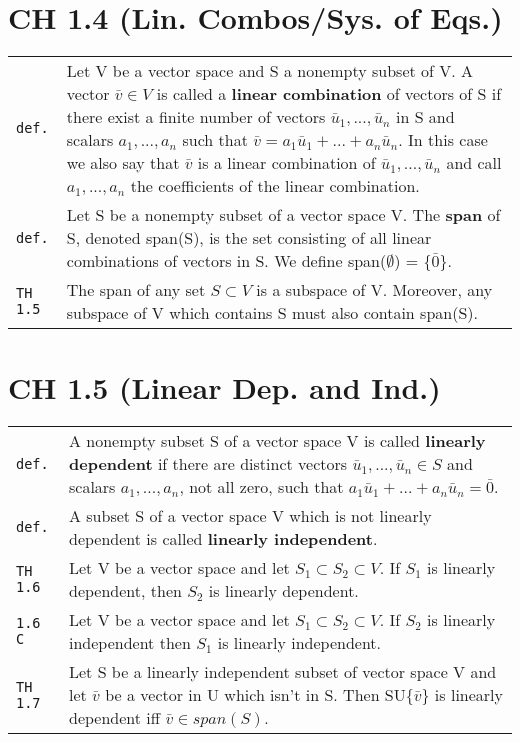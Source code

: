\documentclass[10pt,landscape]{article}
\begin{document}
\begin{multicols}{3}
\section{CH 1.4 (Lin. Combos/Sys. of Eqs.)}
\begin{tabular}{@{}p{\the\MyLen}%
                @{}p{\linewidth-\the\MyLen}@{}} %
\verb!def.! & Let V be a vector space and S a nonempty subset of V. A vector $\bar v \in V$ is called a \textbf{linear combination} of vectors of S if there exist a finite number of vectors $\bar u_1 , ..., \bar u_n$ in S and scalars $a_1 ,..., a_n$ such that $\bar v = a_1 \bar u_1 + ... + a_n \bar u_n$.
		   In this case we also say that $\bar v$ is a linear combination of $\bar u_1 ,..., \bar u_n$ and call $a_1 ,..., a_n$ the coefficients of the linear combination.\\
\verb!def.! & Let S be a nonempty subset of a vector space V. The \textbf{span} of S, denoted span(S), is the set consisting of all linear combinations of vectors in S. We define span($\emptyset$) = \{$\bar 0$\}.\\
\verb!TH 1.5! & The span of any set $S\subset V$ is a subspace of V. Moreover, any subspace of V which contains S must also contain span(S).
\end{tabular}

\section{CH 1.5 (Linear Dep. and Ind.)}
\begin{tabular}{@{}p{\the\MyLen}%
                @{}p{\linewidth-\the\MyLen}@{}} %
\verb!def.! & A nonempty subset S of a vector space V is called \textbf{linearly dependent} if there are distinct vectors $\bar u_1 ,..., \bar u_n \in S$ and scalars $a_1 ,..., a_n$, not all zero, such that $a_1\bar u_1 +...+ a_n\bar u_n = \bar 0$.\\
\verb!def.! & A subset S of a vector space V which is not linearly dependent is called \textbf{linearly independent}.\\
\verb!TH 1.6! & Let V be a vector space and let $S_1 \subset S_2 \subset V$. If $S_1$ is linearly dependent, then $S_2$ is linearly dependent.\\
\verb!1.6 C! & Let V be a vector space and let $S_1 \subset S_2 \subset V$. If $S_2$ is linearly independent then $S_1$ is linearly independent.\\
\verb!TH 1.7! & Let S be a linearly independent subset of vector space V and let $\bar v$ be a vector in U which isn't in S. Then SU\{$\bar v$\} is linearly dependent iff $\bar v \in span(S)$.\\
\end{tabular}


\end{multicols}
\end{document}
